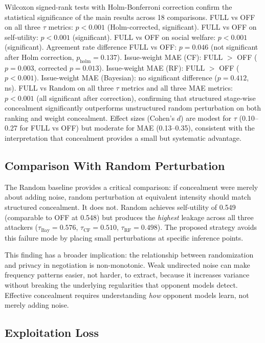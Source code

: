 \documentclass[runningheads]{llncs}
\begin{document}
Wilcoxon signed-rank tests with Holm-Bonferroni correction
confirm the statistical significance of the main results across 18 comparisons. FULL vs OFF on all three $\tau$ metrics: $p < 0.001$ (Holm-corrected, significant). FULL vs OFF on self-utility: $p < 0.001$ (significant). FULL vs OFF on social welfare: $p < 0.001$ (significant). Agreement rate difference FULL vs OFF: $p = 0.046$ (not significant after Holm correction, $p_{\text{holm}} = 0.137$). Issue-weight MAE (CF): FULL $>$ OFF ($p = 0.003$, corrected $p = 0.013$). Issue-weight MAE (RF): FULL $>$ OFF ($p < 0.001$). Issue-weight MAE (Bayesian): no significant difference ($p = 0.412$, ns). FULL vs Random on all three $\tau$ metrics and all three MAE metrics: $p < 0.001$ (all significant after correction), confirming that structured stage-wise concealment significantly outperforms unstructured random perturbation on both ranking and weight concealment. Effect sizes (Cohen's $d$) are modest for $\tau$ (0.10--0.27 for FULL vs OFF) but moderate for MAE (0.13--0.35), consistent with the interpretation that concealment provides a small but systematic advantage.

\subsection{Comparison With Random Perturbation}

The Random baseline provides a critical comparison: if concealment were merely about adding noise, random perturbation at equivalent intensity should match structured concealment. It does not. Random achieves self-utility of 0.549 (comparable to OFF at 0.548) but produces the \emph{highest} leakage across all three attackers ($\tau_{\text{Bay}} = 0.576$, $\tau_{\text{CF}} = 0.510$, $\tau_{\text{RF}} = 0.498$). The proposed strategy avoids this failure mode by placing small perturbations at specific inference points.

This finding has a broader implication: the relationship between randomization and privacy in negotiation is non-monotonic. Weak undirected noise can make frequency patterns easier, not harder, to extract, because it increases variance without breaking the underlying regularities that opponent models detect. Effective concealment requires understanding \emph{how} opponent models learn, not merely adding noise.

\subsection{Exploitation Loss}
\end{document}
